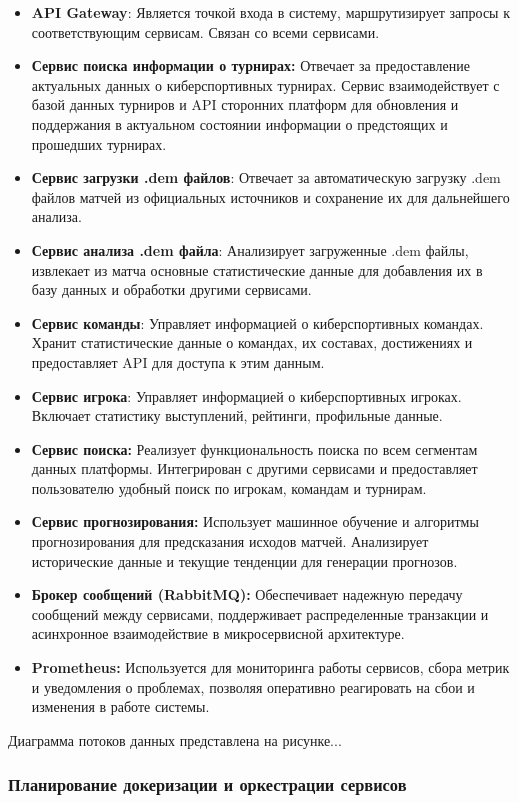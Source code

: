 \begin{itemize}
	\item \textbf{API Gateway}: Является точкой входа в систему, маршрутизирует запросы к соответствующим сервисам. Связан со всеми сервисами.
	\item \textbf{Сервис поиска информации о турнирах:} Отвечает за предоставление актуальных данных о киберспортивных турнирах. Сервис взаимодействует с базой данных турниров и API сторонних платформ для обновления и поддержания в актуальном состоянии информации о предстоящих и прошедших турнирах.
	\item \textbf{Сервис загрузки .dem файлов}: Отвечает за автоматическую загрузку .dem файлов матчей из официальных источников и сохранение их для дальнейшего анализа.
	\item \textbf{Сервис анализа .dem файла}: Анализирует загруженные .dem файлы, извлекает из матча основные статистические данные для добавления их в базу данных и обработки другими сервисами.
	\item \textbf{Сервис команды}: Управляет информацией о киберспортивных командах. Хранит статистические данные о командах, их составах, достижениях и предоставляет API для доступа к этим данным.
	\item \textbf{Сервис игрока}: Управляет информацией о киберспортивных игроках. Включает статистику выступлений, рейтинги, профильные данные.
	\item \textbf{Сервис поиска:} Реализует функциональность поиска по всем сегментам данных платформы. Интегрирован с другими сервисами и предоставляет пользователю удобный поиск по игрокам, командам и турнирам.
	\item \textbf{Сервис прогнозирования:} Использует машинное обучение и алгоритмы прогнозирования для предсказания исходов матчей. Анализирует исторические данные и текущие тенденции для генерации прогнозов.
	\item \textbf{Брокер сообщений (RabbitMQ):} Обеспечивает надежную передачу сообщений между сервисами, поддерживает распределенные транзакции и асинхронное взаимодействие в микросервисной архитектуре.
	\item \textbf{Prometheus:} Используется для мониторинга работы сервисов, сбора метрик и уведомления о проблемах, позволяя оперативно реагировать на сбои и изменения в работе системы.
\end{itemize}

Диаграмма потоков данных представлена на рисунке...

\subsubsection{Планирование докеризации и оркестрации сервисов}

